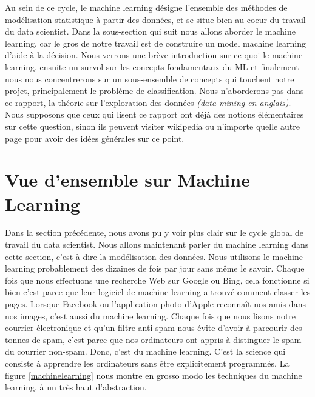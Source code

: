 \documentclass[12pt, french]{report}
\begin{document}
Au sein de ce cycle, le machine learning désigne l'ensemble des méthodes de modélisation statistique à partir des données, et se situe bien au coeur du travail du data scientist. Dans la sous-section qui suit nous allons aborder le machine learning, car le gros de notre travail est de construire un model machine learning d'aide à la décision. Nous verrons une brève introduction sur ce quoi le machine learning, ensuite un survol sur les concepts fondamentaux du ML et finalement nous nous concentrerons sur un sous-ensemble de concepts qui touchent notre projet, principalement le problème de classification. Nous n'aborderons pas dans ce rapport, la théorie sur l'exploration des données \textit{(data mining en anglais)}. Nous supposons que ceux qui lisent ce rapport ont déjà des notions élémentaires sur cette question, sinon ils peuvent visiter wikipedia ou n'importe quelle autre page pour avoir des idées générales sur ce point.

\section{Vue d'ensemble sur Machine Learning}

Dans la section précédente, nous avons pu y voir plus clair sur le cycle global de travail du data scientist. Nous allons maintenant parler du machine learning dans cette section, c'est à dire la modélisation des données. Nous utilisons le machine learning probablement des dizaines de fois par jour sans même le savoir. Chaque fois que nous effectuons une recherche Web sur Google ou Bing, cela fonctionne si bien c'est parce que leur logiciel de machine learning a trouvé comment classer les pages. Lorsque Facebook ou l'application photo d'Apple reconnaît nos amis dans nos images, c'est aussi du machine learning. Chaque fois que nous lisons notre courrier électronique et qu'un filtre anti-spam nous évite d'avoir à parcourir des tonnes de spam, c'est parce que nos ordinateurs ont appris à distinguer le spam du courrier non-spam. Donc, c'est du machine learning. C'est la science qui consiste à apprendre les ordinateurs sans être explicitement programmés. La figure \ref{machinelearning} nous montre en grosso modo les techniques du machine learning, à un très haut d'abstraction. \\
\end{document}
